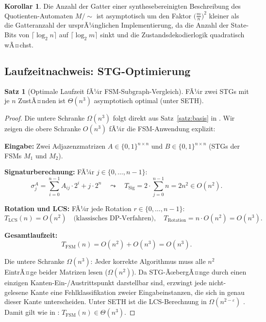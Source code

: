 ﻿\documentclass[a4paper,12pt]{article}
\theoremstyle{definition}
\newtheorem{satz}{Satz}
\newtheorem{korollar}{Korollar}
\begin{document}
\begin{korollar}
  Die Anzahl der Gatter einer synthesebereinigten Beschreibung des Quotienten-Automaten
  $M/\!\sim$ ist asymptotisch um den Faktor $\bigl(\frac{m}{n}\bigr)^2$ kleiner als die
  Gatteranzahl der ursprÃ¼nglichen Implementierung, da die Anzahl der State-Bits von
  $\lceil \log_2 n \rceil$ auf $\lceil \log_2 m \rceil$ sinkt und die Zustandsdekodierlogik
  quadratisch wÃ¤chst.
\end{korollar}

\subsection{Laufzeitnachweis: STG-Optimierung}\label{sec:stg_laufzeit}

\begin{satz}[Optimale Laufzeit fÃ¼r FSM-Subgraph-Vergleich]\label{satz:stg_opt}
  FÃ¼r zwei STGs mit je $n$ ZustÃ¤nden ist $\Theta(n^3)$ asymptotisch optimal (unter SETH).
\end{satz}

\begin{proof}
  Die untere Schranke $\Omega(n^3)$ folgt direkt aus Satz~\ref{satz:basis} in
  \cite{subgraph2026}. Wir zeigen die obere Schranke $O(n^3)$ fÃ¼r die FSM-Anwendung
  explizit:

  \textbf{Eingabe:} Zwei Adjazenzmatrizen $A \in \{0,1\}^{n \times n}$ und
  $B \in \{0,1\}^{n \times n}$ (STGs der FSMs $M_1$ und $M_2$).

  \textbf{Signaturberechnung:} FÃ¼r $j \in \{0, \ldots, n-1\}$:
  \[
    \sigma_j^A = \sum_{i=0}^{n-1} A_{ij} \cdot 2^i + j \cdot 2^n
    \quad \leadsto \quad T_{\text{Sig}} = 2 \cdot \sum_{j=0}^{n-1} n = 2n^2 \in O(n^2).
  \]

  \textbf{Rotation und LCS:} FÃ¼r jede Rotation $r \in \{0, \ldots, n-1\}$:
  \[
    T_{\text{LCS}}(n) = O(n^2) \quad \text{(klassisches DP-Verfahren)},
    \quad T_{\text{Rotation}} = n \cdot O(n^2) = O(n^3).
  \]

  \textbf{Gesamtlaufzeit:}
  \[
    T_{\text{FSM}}(n) = O(n^2) + O(n^3) = O(n^3).
  \]

  Die untere Schranke $\Omega(n^3)$: Jeder korrekte Algorithmus muss alle $n^2$
  EintrÃ¤ge beider Matrizen lesen ($\Omega(n^2)$). Da STG-ÃœbergÃ¤nge durch einen
  einzigen Kanten-Ein-/Austrittspunkt darstellbar sind, erzwingt jede nicht-gelesene
  Kante eine Fehlklassifikation zweier Eingabeinstanzen, die sich in genau dieser Kante
  unterscheiden. Unter SETH ist die LCS-Berechnung in $\Omega(n^{2-\varepsilon})$
  \cite{abboud2015tight}. Damit gilt wie in \cite{subgraph2026}: $T_{\text{FSM}}(n)
  \in \Theta(n^3)$.
\end{proof}
\end{document}
